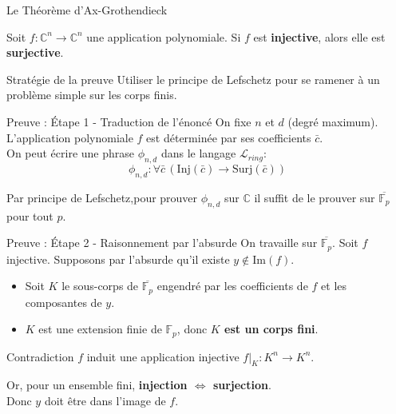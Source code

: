 \documentclass{beamer}
\begin{document}
\begin{frame}{Le Théorème d'Ax-Grothendieck}
    \begin{theorem}[Ax-Grothendieck, 1966]
        Soit $f : \mathbb{C}^n \to \mathbb{C}^n$ une application polynomiale. 
        Si $f$ est \textbf{injective}, alors elle est \textbf{surjective}.
    \end{theorem}

    \pause
    
    \begin{exampleblock}{Stratégie de la preuve}
        Utiliser le principe de Lefschetz pour se ramener à un problème simple sur les corps finis.
    \end{exampleblock}
\end{frame}

\begin{frame}{Preuve : Étape 1 - Traduction de l'énoncé}
    On fixe $n$ et $d$ (degré maximum). L'application polynomiale
    $f$ est déterminée par ses coefficients $\bar{c}$. \\
    \pause
    On peut écrire une phrase $\phi_{n,d}$ dans le langage $\mathcal{L}_{ring}$:
    \[ \phi_{n,d} : \forall \bar{c} \, (\text{Inj}(\bar{c}) \to \text{Surj}(\bar{c})) \]
    
    \pause
    Par principe de Lefschetz,pour prouver $\phi_{n,d}$ sur $\mathbb{C}$ il
    suffit de le prouver sur $\overline{\mathbb{F}_p}$ pour tout $p$.

\end{frame}

\begin{frame}{Preuve : Étape 2 - Raisonnement par l'absurde}
    On travaille sur $\overline{\mathbb{F}_p}$. Soit $f$ injective. Supposons par l'absurde qu'il existe $y \notin \text{Im}(f)$.
    
    \pause
    \begin{itemize}
        \item Soit $K$ le sous-corps de $\overline{\mathbb{F}_p}$ engendré par les coefficients de $f$ et les composantes de $y$.
        \pause
        \item $K$ est une extension finie de $\mathbb{F}_p$, donc \textbf{$K$ est un corps fini}.
    \end{itemize}
    
    \pause
    \begin{alertblock}{Contradiction}
        $f$ induit une application injective $f|_K : K^n \to K^n$. \\

        \pause

        Or, pour un ensemble fini, \textbf{injection $\iff$ surjection}. \\

        Donc $y$ doit être dans l'image de $f$.
    \end{alertblock}
\end{frame}
\end{document}
